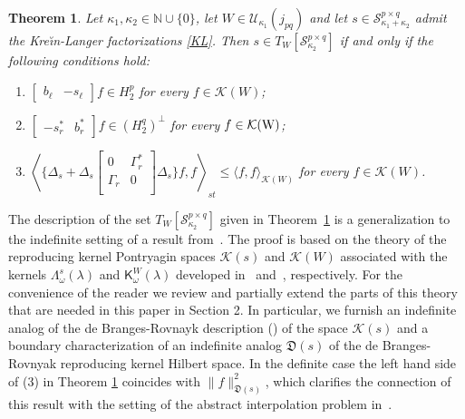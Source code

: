 \documentclass[12pt,twoside,a4paper]{amsart}
\newtheorem{thm}{Theorem}[section]
\theoremstyle{definition}
\numberwithin{equation}{section}
\begin{document}
\begin{thm}
\label{thm:0.1} Let $\kappa_1,\kappa_2\in{{\mathbb N}}\cup\{0\}$, let $W\in
{{\mathcal U}}_{\kappa_1}(j_{pq})$ and let
$s\in {\mathcal S}^{p\times q}_{\kappa_1+\kappa_2}$ admit the
Kre\u{\i}n-Langer factorizations \eqref{KL}. Then
$s\in T_W[{\mathcal S}^{p\times q}_{\kappa_2}]$ if and
only if the following conditions hold:
\begin{enumerate}
    \item [\rm(1)]
    $\begin{bmatrix}
      b_{\ell} & -s_{\ell}
    \end{bmatrix}f\in H_2^p$ for every $f\in
    {{\mathcal K}}(W)$; \vskip 6pt
    \item [\rm(2)]
    $\begin{bmatrix}
      -s_r^* & b_r^*
    \end{bmatrix} f\in (H_2^q)^\perp$ for every $f\in
    {{\mathcal K}}\rm(W)$; \vskip 6pt
    \item[\rm(3)]
    $
   {\displaystyle \left\langle \{\Delta_s
     +\Delta_s
     \left[\begin{array}{cc}
       0 & \Gamma_r^* \\
       \Gamma_r & 0 \\
    \end{array}\right]\Delta_s\}f,f\right
    \rangle_{st}\le\langle f,f\rangle_{{{\mathcal K}}(W)}}
    $ for every $f\in
    {{\mathcal K}}(W)$.
    \end{enumerate}
\end{thm}
The description of the set $T_W[{\mathcal S}_{\kappa_2}^{p\times q}]$ given in
Theorem~\ref{thm:0.1} is
a generalization to the indefinite setting of a result from~\cite{D8}. The
proof is
based on the theory of the reproducing kernel Pontryagin  spaces ${{\mathcal K}}(s)$ and
${{\mathcal K}}(W)$
associated with the kernels ${\mathsf \Lambda}_\omega^s(\lambda)$ and ${\mathsf
K}_\omega^W(\lambda)$ developed in~\cite{ADRS} and~\cite{AD86}, respectively.
For the
convenience of the reader we review and partially extend  the parts of this
theory that
are needed in this paper in Section 2. In particular, we furnish an
indefinite analog of
the de Branges-Rovnayk description (\cite{dBR}) of the space ${{\mathcal K}}(s)$ and a
boundary
characterization of an indefinite analog ${{\mathfrak D}}(s)$ of the de Branges-Rovnyak
reproducing
kernel Hilbert space. In the definite case the left hand side of (3) in Theorem
\ref{thm:0.1} coincides with $\|f\|_{{{\mathfrak D}}(s)}^2$, which clarifies the
connection of this
result with the setting of the abstract interpolation problem in~\cite{KKhYu}.
\end{document}
